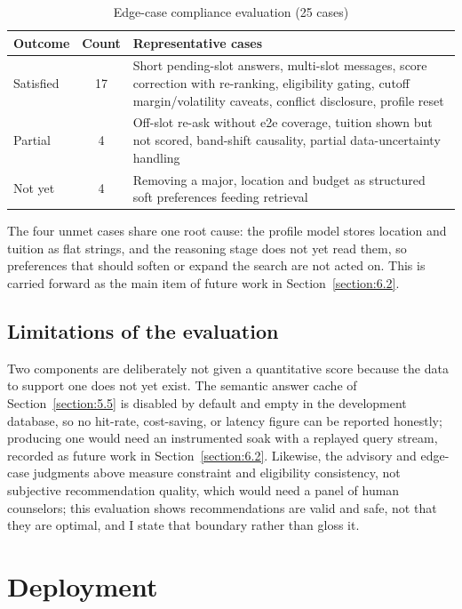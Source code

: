 \documentclass[../main.tex]{subfiles}
\begin{document}
\begin{table}[H]
    \centering
    \caption{Edge-case compliance evaluation (25 cases)}
    \label{table:edge-cases}
    \begin{tabular}{|p{2.6cm}|c|p{8.2cm}|}
        \hline
        \textbf{Outcome} & \textbf{Count} & \textbf{Representative cases} \\
        \hline
        Satisfied & 17 & Short pending-slot answers, multi-slot messages, score correction with re-ranking, eligibility gating, cutoff margin/volatility caveats, conflict disclosure, profile reset \\
        \hline
        Partial & 4 & Off-slot re-ask without e2e coverage, tuition shown but not scored, band-shift causality, partial data-uncertainty handling \\
        \hline
        Not yet & 4 & Removing a major, location and budget as structured soft preferences feeding retrieval \\
        \hline
    \end{tabular}
\end{table}

The four unmet cases share one root cause: the profile model stores location and tuition as flat strings, and the reasoning stage does not yet read them, so preferences that should soften or expand the search are not acted on.
This is carried forward as the main item of future work in Section~\ref{section:6.2}.

\subsection{Limitations of the evaluation}
\label{subsection:4.4.8}

Two components are deliberately not given a quantitative score because the data to support one does not yet exist.
The semantic answer cache of Section~\ref{section:5.5} is disabled by default and empty in the development database, so no hit-rate, cost-saving, or latency figure can be reported honestly; producing one would need an instrumented soak with a replayed query stream, recorded as future work in Section~\ref{section:6.2}.
Likewise, the advisory and edge-case judgments above measure constraint and eligibility consistency, not subjective recommendation quality, which would need a panel of human counselors; this evaluation shows recommendations are valid and safe, not that they are optimal, and I state that boundary rather than gloss it.

\section{Deployment}
\label{section:4.5}
\end{document}
